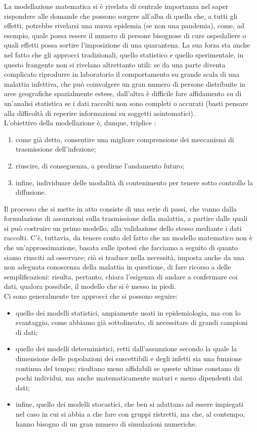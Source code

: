 La modellazione matematica si è rivelata di centrale importanza nel saper rispondere alle domande che possono sorgere all'alba di quella che, a tutti gli effetti, potrebbe rivelarsi una nuova epidemia (se non una pandemia), come, ad esempio, quale possa essere il numero di persone bisognose di cure ospedaliere o quali effetti possa sortire l'imposizione di una quarantena. La sua forza sta anche nel fatto che gli approcci tradizionali, quello statistico e quello sperimentale, in questo frangente non si rivelano altrettanto utili: se da una parte diventa complicato riprodurre in laboratorio il comportamento su grande scala di una malattia infettiva, che può coinvolgere un gran numero di persone distribuite in aree geografiche spazialmente estese, dall'altra è difficile fare affidamento su di un'analisi statistica se i dati raccolti non sono completi o accurati (basti pensare alla difficoltà di reperire informazioni su soggetti asintomatici). \\ L'obiettivo della modellazione è, dunque, triplice \cite{Daley}:
\begin{enumerate}
\item come già detto, consentire una migliore comprensione dei meccanismi di trasmissione dell'infezione;
\item riuscire, di conseguenza, a predirne l'andamento futuro;
\item infine, individuare delle modalità di contenimento per tenere sotto controllo la diffusione.
\end{enumerate}
Il processo che si mette in atto consiste di una serie di passi, che vanno dalla formulazione di assunzioni sulla trasmissione della malattia, a partire dalle quali si può costruire un primo modello, alla validazione dello stesso mediante i dati raccolti. C'è, tuttavia, da tenere conto del fatto che un modello matematico non è che un'approssimazione, basata sulle ipotesi che facciamo a seguito di quanto siamo riusciti ad osservare; ciò si traduce nella necessità, imposta anche da una non adeguata conoscenza della malattia in questione, di fare ricorso a delle semplificazioni: risulta, pertanto, chiara l'esigenza di andare a confermare coi dati, qualora possibile, il modello che si è messo in piedi. \\ Ci sono generalmente tre approcci che si possono seguire:
\begin{itemize}
\item quello dei modelli statistici, ampiamente usati in epidemiologia, ma con lo svantaggio, come abbiamo già sottolineato, di necessitare di grandi campioni di dati;
\item quello dei modelli deterministici, retti dall'assunzione secondo la quale la dimensione delle popolazioni dei suscettibili e degli infetti sia una funzione continua del tempo; risultano meno affidabili se queste ultime constano di pochi individui, ma anche matematicamente maturi e meno dipendenti dai dati;
\item infine, quello dei modelli stocastici, che ben si adattano ad essere impiegati nel caso in cui si abbia a che fare con gruppi ristretti, ma che, al contempo, hanno bisogno di un gran numero di simulazioni numeriche.  
\end{itemize}
